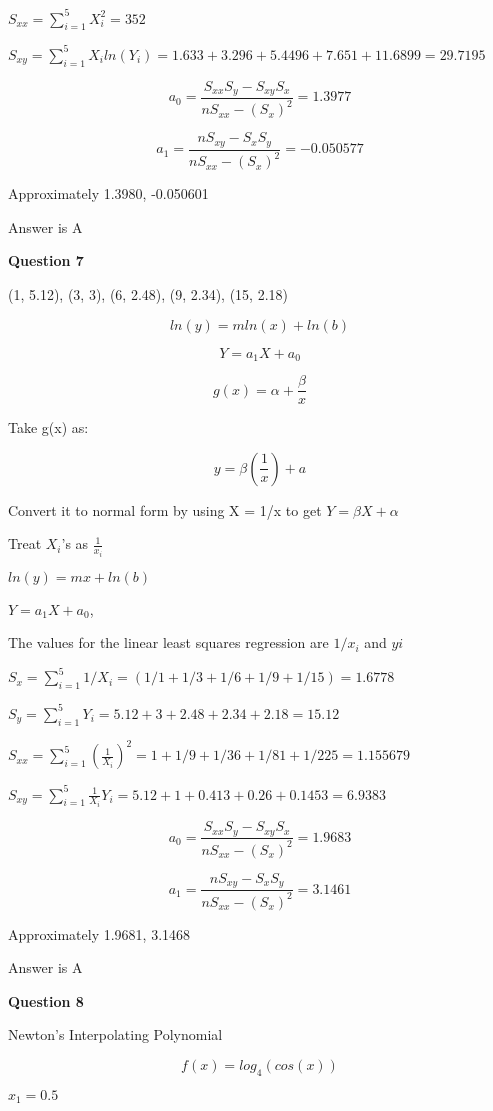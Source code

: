 \documentclass{article}
\begin{document}
$S_{xx} = \sum^{5}_{i=1}X_i^2 = 352$


$S_{xy} = \sum^{5}_{i=1}X_iln(Y_i) = 1.633 + 3.296 + 5.4496 + 7.651 + 11.6899 = 29.7195 $


\[a_0 = \frac{S_{xx}S_y - S_{xy}S_x}{nS_{xx}-(S_x)^2} = 1.3977  \]

\[a_1 = \frac{nS_{xy} - S_{x}S_y}{nS_{xx}-(S_x)^2} = - 0.050577 \]



Approximately 1.3980, -0.050601

Answer is A


\textbf{Question 7}

(1, 5.12), (3, 3), (6, 2.48), (9, 2.34), (15, 2.18)

\[ln(y) = mln(x) + ln(b)\]

\[Y = a_1X + a_0\]

\[g(x) = \alpha + \frac{\beta}{x}\]

Take g(x) as:

\[y = \beta(\frac{1}{x}) + a\]

Convert it to normal form by using X = 1/x
to get $ Y = \beta X + \alpha$

Treat $X_i$'s as $\frac{1}{x_i}$


$ln(y) = mx + ln(b)$

$ Y = a_1X + a_0$,


The values for the linear least squares regression are $1/x_i$ and $yi$


$S_x = \sum^{5}_{i=1}1/X_i = (1/1 + 1/3 + 1/6 + 1/9 + 1/15) = 1.6778$


$S_y = \sum^{5}_{i=1}Y_i = 5.12 + 3 + 2.48 + 2.34 + 2.18 = 15.12$


$S_{xx} = \sum^{5}_{i=1}(\frac{1}{X_i})^2 =1 + 1/9 + 1/36 + 1/81 + 1/225 = 1.155679 $


$S_{xy} = \sum^{5}_{i=1}\frac{1}{X_i}Y_i = 5.12 + 1 + 0.413 + 0.26 + 0.1453 = 6.9383$


\[a_0 = \frac{S_{xx}S_y - S_{xy}S_x}{nS_{xx}-(S_x)^2} = 1.9683  \]

\[a_1 = \frac{nS_{xy} - S_{x}S_y}{nS_{xx}-(S_x)^2} = 3.1461 \]



Approximately 1.9681, 3.1468

Answer is A


\textbf{Question 8}

Newton's Interpolating Polynomial

\[f(x) = log_4(cos(x))\]

$x_1 = 0.5$
\end{document}
